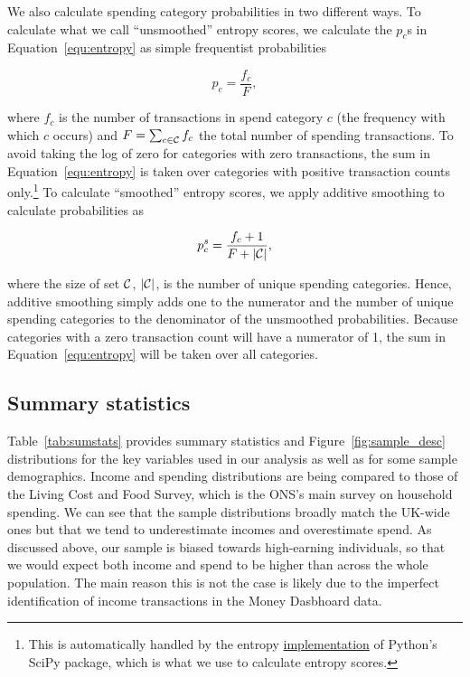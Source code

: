 We also calculate spending category probabilities in two different ways. To
calculate what we call ``unsmoothed'' entropy scores, we calculate the $p_c$s
in Equation~\ref{equ:entropy} as simple frequentist probabilities

\begin{equation}
    p_c = \frac{f_c}{F},
\end{equation}

\noindent where $f_c$ is the number of transactions in spend category $c$ (the
frequency with which $c$ occurs) and $F = \sum_{c \in \mathcal{C}}f_c$ the total
number of spending transactions. To avoid taking the log of zero for categories
with zero transactions, the sum in Equation~\ref{equ:entropy} is taken over
categories with positive transaction counts only.\footnote{This is
    automatically handled by the entropy
    \href{https://docs.scipy.org/doc/scipy/reference/generated/scipy.stats.entropy.html}{implementation}
of Python's SciPy package, which is what we use to calculate entropy scores.}
To calculate ``smoothed'' entropy scores, we apply additive smoothing to
calculate probabilities as

\begin{equation}
    \label{equ:prob_s}
    p_c^{s} = \frac{f_c + 1}{F + |\mathcal{C}|},
\end{equation}

\noindent where the size of set $\mathcal{C}$, $|\mathcal{C}|$, is the number of unique
spending categories. Hence, additive smoothing simply adds one to the numerator
and the number of unique spending categories to the denominator of the
unsmoothed probabilities. Because categories with a zero transaction count will
have a numerator of 1, the sum in Equation~\ref{equ:entropy} will be taken over
all categories.


\subsection{Summary statistics}%
\label{par:summary_statistics}

Table~\ref{tab:sumstats} provides summary statistics and
Figure~\ref{fig:sample_desc} distributions for the key variables used in our
analysis as well as for some sample demographics. Income and spending
distributions are being compared to those of the Living Cost and Food
Survey, which is the ONS's main survey on household spending. We can see that
the sample distributions broadly match the UK-wide ones but that we tend to
underestimate incomes and overestimate spend. As discussed above, our sample is
biased towards high-earning individuals, so that we would expect both income
and spend to be higher than across the whole population. The main reason this
is not the case is likely due to the imperfect identification of income
transactions in the Money Dasbhoard data.

